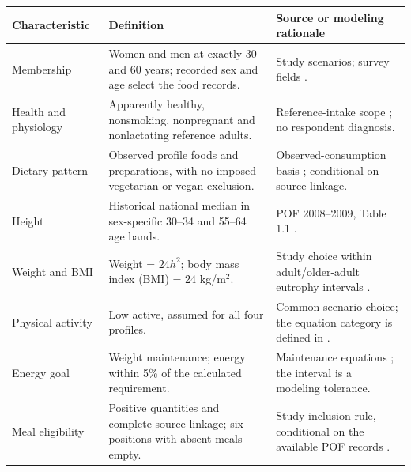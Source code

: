 \begin{tabularx}{\textwidth}{l*{2}{>{\raggedright\arraybackslash}X}}
\toprule
Characteristic & Definition & Source or modeling rationale \\
\midrule
Membership & Women and men at exactly 30 and 60 years; recorded sex and age select the food records. & Study scenarios; survey fields \cite{ibge2020pof}. \\
\midrule
Health and physiology & Apparently healthy, nonsmoking, nonpregnant and nonlactating reference adults. & Reference-intake scope \cite{healthcanada2025vitamins,healthcanada2025elements}; no respondent diagnosis. \\
\midrule
Dietary pattern & Observed profile foods and preparations, with no imposed vegetarian or vegan exclusion. & Observed-consumption basis \cite{ibge2020pof}; conditional on source linkage. \\
\midrule
Height & Historical national median in sex-specific 30--34 and 55--64 age bands. & POF 2008--2009, Table 1.1 \cite{ibge2010anthropometry}. \\
\midrule
Weight and BMI & Weight = $24h^2$; body mass index (BMI) = 24 kg/m$^2$. & Study choice within adult/older-adult eutrophy intervals \cite{brasil2004sisvan}. \\
\midrule
Physical activity & Low active, assumed for all four profiles. & Common scenario choice; the equation category is defined in \cite{nases2023energy}. \\
\midrule
Energy goal & Weight maintenance; energy within 5\% of the calculated requirement. & Maintenance equations \cite{nases2023energy}; the interval is a modeling tolerance. \\
\midrule
Meal eligibility & Positive quantities and complete source linkage; six positions with absent meals empty. & Study inclusion rule, conditional on the available POF records \cite{ibge2020pof}. \\
\midrule
\bottomrule
\end{tabularx}
